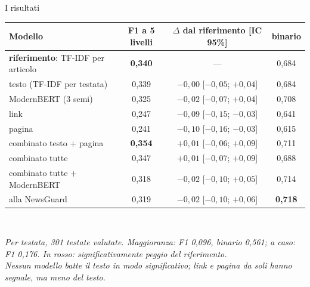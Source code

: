 \documentclass[aspectratio=169]{beamer}
\newcommand{\hl}[1]{\textbf{#1}}
\newcommand{\wrong}[1]{\textcolor{wrongred}{#1}}
\begin{document}
\begin{frame}{I risultati}
  \centering\footnotesize
  \begin{tabular}{lccc}
    \toprule
    \textbf{Modello} & \textbf{F1 a 5 livelli} & \textbf{$\Delta$ dal riferimento [IC 95\%]} & \textbf{binario} \\
    \midrule
    \hl{riferimento}: TF-IDF per articolo & \hl{0,340} & --- & 0,684 \\
    testo (TF-IDF per testata) & 0,339 & $-0{,}00$ [$-0{,}05$; $+0{,}04$] & 0,684 \\
    ModernBERT (3 semi) & 0,325 & $-0{,}02$ [$-0{,}07$; $+0{,}04$] & 0,708 \\
    link & 0,247 & \wrong{$-0{,}09$ [$-0{,}15$; $-0{,}03$]} & 0,641 \\
    pagina & 0,241 & \wrong{$-0{,}10$ [$-0{,}16$; $-0{,}03$]} & 0,615 \\
    \midrule
    combinato testo + pagina & \hl{0,354} & $+0{,}01$ [$-0{,}06$; $+0{,}09$] & 0,711 \\
    combinato tutte & 0,347 & $+0{,}01$ [$-0{,}07$; $+0{,}09$] & 0,688 \\
    combinato tutte + ModernBERT & 0,318 & $-0{,}02$ [$-0{,}10$; $+0{,}05$] & 0,714 \\
    alla NewsGuard & 0,319 & $-0{,}02$ [$-0{,}10$; $+0{,}06$] & \hl{0,718} \\
    \bottomrule
  \end{tabular}\\[0.5em]
  \raggedright\scriptsize\itshape Per testata, 301 testate valutate. Maggioranza: F1 0,096, binario 0,561; a caso: F1 0,176. In rosso: significativamente peggio del riferimento.\\[0.6em]
  \centering\small\upshape Nessun modello batte il testo in modo significativo; link e pagina da soli hanno segnale, ma meno del testo.
\end{frame}
\end{document}
